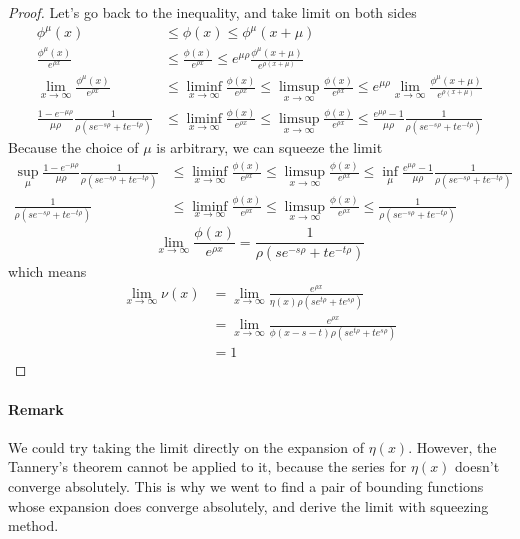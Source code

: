 \documentclass[]{article}
\begin{document}
\begin{proof}
Let's go back to the inequality, and take limit on both sides
\begin{align*}
\phi^{\mu}(x)&\le\phi(x)\le\phi^{\mu}(x+\mu) \\
\frac{\phi^{\mu}(x)}{e^{\rho x}}&\le\frac{\phi(x)}{e^{\rho x}}\le e^{\mu\rho} \frac{\phi^{\mu}(x+\mu)}{e^{\rho (x+\mu)}} \\
\lim_{x\to\infty}\frac{\phi^{\mu}(x)}{e^{\rho x}} &\le \liminf_{x\to\infty}\frac{\phi(x)}{e^{\rho x}} \le \limsup_{x\to\infty}\frac{\phi(x)}{e^{\rho x}}\le e^{\mu\rho} \lim_{x\to\infty}\frac{\phi^{\mu}(x+\mu)}{e^{\rho (x+\mu)}} \\
 \frac{1-e^{-\mu \rho}}{\mu \rho}\frac{1}{\rho(se^{-s\rho}+te^{-t\rho})} &\le \liminf_{x\to\infty}\frac{\phi(x)}{e^{\rho x}} \le \limsup_{x\to\infty}\frac{\phi(x)}{e^{\rho x}}\le  \frac{e^{\mu \rho}-1}{\mu \rho}\frac{1}{\rho(se^{-s\rho}+te^{-t\rho})}
\end{align*}
Because the choice of $\mu$ is arbitrary, we can squeeze the limit
\begin{align*}
 \sup_{\mu}\frac{1-e^{-\mu \rho}}{\mu \rho}\frac{1}{\rho(se^{-s\rho}+te^{-t\rho})} &\le \liminf_{x\to\infty}\frac{\phi(x)}{e^{\rho x}} \le \limsup_{x\to\infty}\frac{\phi(x)}{e^{\rho x}}\le \inf_{\mu}\frac{e^{\mu \rho}-1}{\mu \rho}\frac{1}{\rho(se^{-s\rho}+te^{-t\rho})}\\
\frac{1}{\rho(se^{-s\rho}+te^{-t\rho})} &\le \liminf_{x\to\infty}\frac{\phi(x)}{e^{\rho x}} \le \limsup_{x\to\infty}\frac{\phi(x)}{e^{\rho x}}\le \frac{1}{\rho(se^{-s\rho}+te^{-t\rho})}
\end{align*}
\[
\lim_{x\to\infty} \frac{\phi(x)}{e^{\rho x}} = \frac{1}{\rho(se^{-s\rho}+te^{-t\rho})}
\]
which means
\begin{align*}
\lim_{x\to\infty} \nu(x) &= \lim_{x\to\infty}  \frac{e^{\rho x}}{\eta(x)\rho(se^{t\rho} + te^{s\rho})} \\
&= \lim_{x\to\infty}  \frac{e^{\rho x}}{\phi(x-s-t)\rho(se^{t\rho} + te^{s\rho})} \\
&= 1
\end{align*}
\end{proof}
\paragraph{Remark}

We could try taking the limit directly on the expansion of $\eta(x)$. However, the Tannery's theorem cannot be applied to it, because the series for $\eta(x)$ doesn't converge absolutely. This is why we went to find a pair of bounding functions whose expansion does converge absolutely, and derive the limit with squeezing method.
\end{document}
